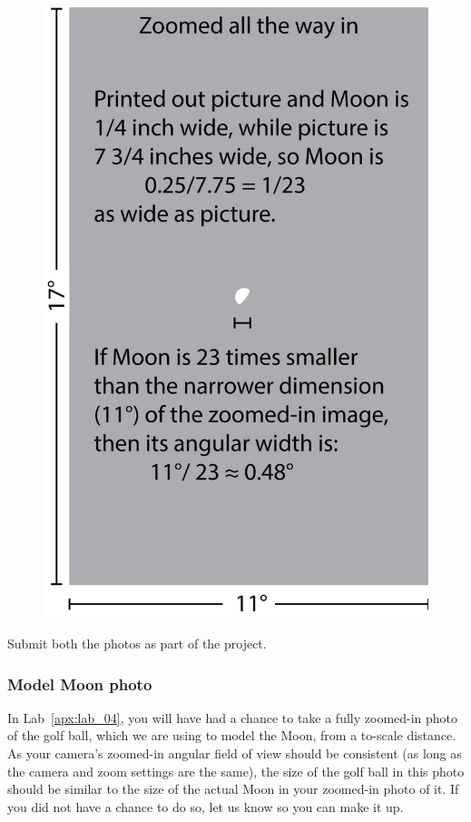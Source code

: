 \documentclass[main.tex]{subfiles}
\begin{document}
\begin{figure}[htbp]
\begin{center}
\begin{minipage}{0.3\textwidth}
	\includegraphics[width=\textwidth]{moonproj_zoomin.jpg}
    \end{minipage}
\caption{}
\label{fig:moonphot}
\end{center}
\end{figure}

Submit both the photos as part of the project.

\subsubsection{Model Moon photo}
In Lab~\ref{apx:lab_04}, you will have had a chance to take a fully zoomed-in photo of the golf ball, which we are using to model the Moon, from a to-scale distance. As your camera's zoomed-in angular field of view should be consistent (as long as the camera and zoom settings are the same), the size of the golf ball in this photo should be similar to the size of the actual Moon in your zoomed-in photo of it. If you did not have a chance to do so, let us know so you can make it up.
\end{document}
